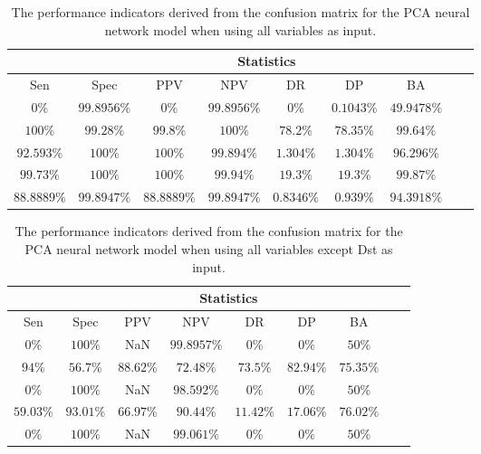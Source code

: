 \begin{table}[!ht]
	\centering
	\begin{tabular}{|c|c|c|c|c|c|c|c|c|}
		\hline
		 & \multicolumn{7}{c|}{Statistics} \\ \hline
		Sen & Spec & PPV & NPV & DR & DP & BA \\ \hline
		$0\%$ & $99.8956\%$ & $0\%$ & $99.8956\%$ & $0\%$ & $0.1043\%$ & $49.9478\%$ \\ \hline
		$100\%$ & $99.28\%$ & $99.8\%$ & $100\%$ & $78.2\%$ & $78.35\%$ & $99.64\%$ \\ \hline
		$92.593\%$ & $100\%$ & $100\%$ & $99.894\%$ & $1.304\%$ & $1.304\%$ & $96.296\%$ \\ \hline
		$99.73\%$ & $100\%$ & $100\%$ & $99.94\%$ & $19.3\%$ & $19.3\%$ & $99.87\%$ \\ \hline
		$88.8889\%$ & $99.8947\%$ & $88.8889\%$ & $99.8947\%$ & $0.8346\%$ & $0.939\%$ & $94.3918\%$ \\ \hline
	\end{tabular}
	\caption{The performance indicators derived from the confusion matrix for the PCA neural network model when using all variables as input.}
	\label{tab:cs:all:pcaNNet}
\end{table}

\begin{table}[!ht]
	\centering
	\begin{tabular}{|c|c|c|c|c|c|c|c|c|}
		\hline
		 & \multicolumn{7}{c|}{Statistics} \\ \hline
		Sen & Spec & PPV & NPV & DR & DP & BA \\ \hline
		$0\%$ & $100\%$ & NaN & $99.8957\%$ & $0\%$ & $0\%$ & $50\%$ \\ \hline
		$94\%$ & $56.7\%$ & $88.62\%$ & $72.48\%$ & $73.5\%$ & $82.94\%$ & $75.35\%$ \\ \hline
		$0\%$ & $100\%$ & NaN & $98.592\%$ & $0\%$ & $0\%$ & $50\%$ \\ \hline
		$59.03\%$ & $93.01\%$ & $66.97\%$ & $90.44\%$ & $11.42\%$ & $17.06\%$ & $76.02\%$ \\ \hline
		$0\%$ & $100\%$ & NaN & $99.061\%$ & $0\%$ & $0\%$ & $50\%$ \\ \hline
	\end{tabular}
	\caption{The performance indicators derived from the confusion matrix for the PCA neural network model when using all variables except Dst as input.}
	\label{tab:cs:noDst:pcaNNet}
\end{table}

